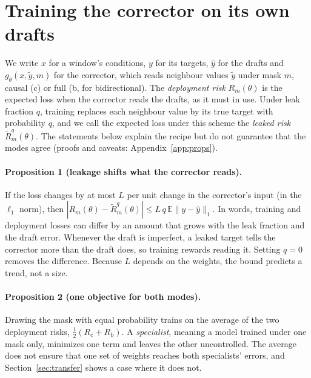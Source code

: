 \documentclass{article}
\begin{document}
\section{Training the corrector on its own drafts}
\label{sec:recipe}
We write $x$ for a window's conditions, $y$ for its targets, $\hat y$ for the drafts and $g_\theta(x,\tilde y,m)$ for the corrector, which reads neighbour values $\tilde y$ under mask $m$, causal (c) or full (b, for bidirectional). The \emph{deployment risk} $R_m(\theta)$ is the expected loss when the corrector reads the drafts, as it must in use. Under leak fraction $q$, training replaces each neighbour value by its true target with probability $q$, and we call the expected loss under this scheme the \emph{leaked risk} $\tilde R^q_m(\theta)$. The statements below explain the recipe but do not guarantee that the modes agree (proofs and caveats: Appendix~\ref{app:props}).

\paragraph{Proposition 1 (leakage shifts what the corrector reads).} If the loss changes by at most $L$ per unit change in the corrector's input (in the $\ell_1$ norm), then $|R_m(\theta)-\tilde R^q_m(\theta)|\le L\,q\,\mathbb{E}\|y-\hat y\|_1$. In words, training and deployment losses can differ by an amount that grows with the leak fraction and the draft error. Whenever the draft is imperfect, a leaked target tells the corrector more than the draft does, so training rewards reading it. Setting $q=0$ removes the difference. Because $L$ depends on the weights, the bound predicts a trend, not a size.

\paragraph{Proposition 2 (one objective for both modes).} Drawing the mask with equal probability trains on the average of the two deployment risks, $\tfrac12(R_\mathrm{c}+R_\mathrm{b})$. A \emph{specialist}, meaning a model trained under one mask only, minimizes one term and leaves the other uncontrolled. The average does not ensure that one set of weights reaches both specialists' errors, and Section~\ref{sec:transfer} shows a case where it does not.
\end{document}
